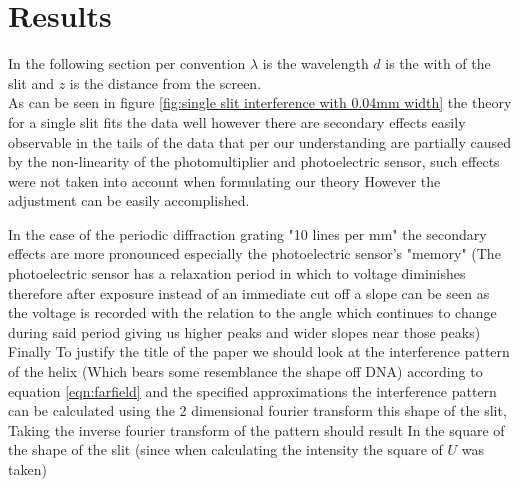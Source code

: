 \section{Results}
In the following section per convention $\lambda$ is the wavelength $d$ is the with of the slit and $z$ is the distance from the screen.\\
As can be seen in figure \ref{fig:single slit interference with 0.04mm width} the theory for a single slit fits the data well however there are
secondary effects easily observable in the tails of the data that per our understanding are partially caused by the non-linearity of the
photomultiplier and photoelectric sensor, such effects were not taken into account when formulating our theory
However the adjustment can be easily accomplished.




In the case of the periodic diffraction grating "10 lines per mm" the secondary effects are more pronounced especially
the photoelectric sensor's "memory" (The photoelectric sensor has a relaxation period in which to voltage diminishes
therefore after exposure instead of an immediate cut off a slope can be seen as the voltage is recorded with the relation
to the angle which continues to change during said period giving us higher peaks and wider slopes near those peaks)\\

Finally To justify the title of the paper we should look at the interference pattern of the helix (Which bears some resemblance the shape off DNA)
according to equation \ref{eqn:farfield} and the specified approximations the interference pattern can be calculated using
the 2 dimensional fourier transform this shape of the slit, Taking the inverse fourier transform of the pattern should result
In the square of the shape of the slit (since when calculating the intensity the square of $U$ was taken)